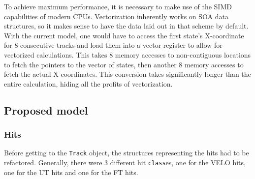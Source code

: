 \documentclass[12pt]{article}
\newcommand{\code}[1]{\texttt{#1}}
\begin{document}
To achieve maximum performance, it is necessary to make use of the SIMD capabilities of modern CPUs. Vectorization inherently works on SOA data structures, so it makes sense to have the data laid out in that scheme by default. With the current model, one would have to access the first state's X-coordinate for 8 consecutive tracks and load them into a vector register to allow for vectorized calculations. This takes 8 memory accesses to non-contiguous locations to fetch the pointers to the vector of states, then another 8 memory accesses to fetch the actual X-coordinates. This conversion takes significantly longer than the entire calculation, hiding all the profits of vectorization.


\subsection{Proposed model}

\subsubsection{Hits}

Before getting to the \code{Track} object, the structures representing the hits had to be refactored. Generally, there were 3 different hit \code{class}es, one for the VELO hits, one for the UT hits and one for the FT hits.
\end{document}
